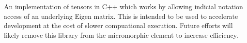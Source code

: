 An implementation of tensors in C++ which works by allowing indicial notation access of an underlying Eigen matrix. This is intended to be used to accelerate development at the cost of slower compuational execution. Future efforts will likely remove this library from the micromorphic element to increase efficiency.
